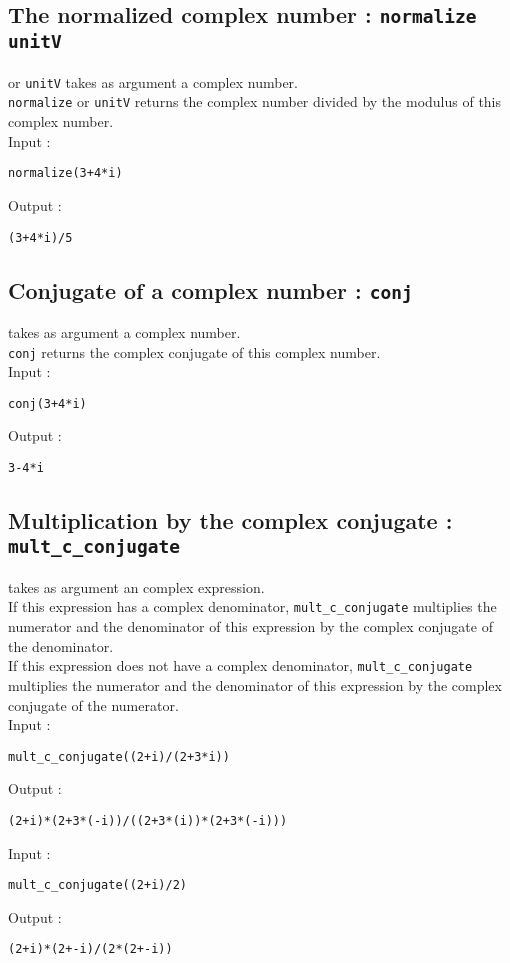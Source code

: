 \documentclass[a4paper,11pt]{book}
\begin{document}
\subsection{The normalized complex number : {\tt normalize unitV}}
 or {\tt unitV} takes as argument a complex number.\\
{\tt normalize} or {\tt unitV} returns the complex number divided by the
modulus of this complex number.\\
Input :
\begin{center}{\tt normalize(3+4*i)}\end{center}
Output :
\begin{center}{\tt (3+4*i)/5}\end{center}

\subsection{Conjugate of a complex number : {\tt conj}}
 takes as argument a complex number.\\
{\tt conj} returns the complex conjugate of this complex number.\\
Input :
\begin{center}{\tt conj(3+4*i)}\end{center}
Output :
\begin{center}{\tt 3-4*i}\end{center}

\subsection{Multiplication by the complex conjugate  :\\
 {\tt mult\_c\_conjugate}}
 takes as argument an complex expression.\\ 
If this expression has a complex denominator,
{\tt mult\_c\_conjugate} multiplies the numerator and the denominator of this 
 expression by the complex conjugate of the denominator.\\
If this  expression does not have a complex denominator,
{\tt mult\_c\_conjugate} multiplies the numerator and the denominator of this 
expression by the complex conjugate of the numerator.\\
Input :
\begin{center}{\tt mult\_c\_conjugate((2+i)/(2+3*i))}\end{center}
Output :
\begin{center}{\tt (2+i)*(2+3*(-i))/((2+3*(i))*(2+3*(-i)))}\end{center}
Input :
\begin{center}{\tt mult\_c\_conjugate((2+i)/2)}\end{center}
Output :
\begin{center}{\tt (2+i)*(2+-i)/(2*(2+-i))}\end{center}
\end{document}
